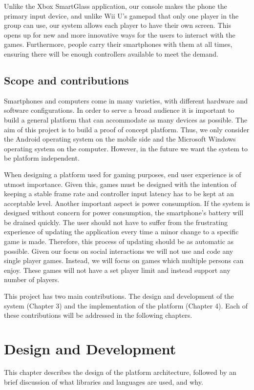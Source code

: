 \documentclass{article}
\begin{document}
Unlike the Xbox SmartGlass application, our console makes the phone the primary input device,
and unlike Wii U’s gamepad that only one player in the group can use, our system allows each
player to have their own screen. This opens up for new and more innovative ways for the users to
interact with the games. Furthermore, people carry their smartphones with them at all times,
ensuring there will be enough controllers available to meet the demand.


\subsection{Scope and contributions} 
Smartphones and computers come in many varieties, with different hardware and software
configurations. In order to serve a broad audience it is important to build a general platform that
can accommodate as many devices as possible. The aim of this project is to build a proof of
concept platform. Thus, we only consider the Android operating system on the mobile side and
the Microsoft Windows operating system on the computer. However, in the future we want the
system to be platform independent.

When designing a platform used for gaming purposes, end user experience is of utmost
importance. Given this, games must be designed with the intention of keeping a stable frame rate
and controller input latency has to be kept at an acceptable level. Another important aspect is
power consumption. If the system is designed without concern for power consumption, the
smartphone's battery will be drained quickly.
The user should not have to suffer from the frustrating experience of updating the application
every time a minor change to a specific game is made. Therefore, this process of updating should
be as automatic as possible.
Given our focus on social interactions we will not use and code any single player games. Instead, we will focus on games which multiple persons can enjoy. These games will not have a set player limit and instead support any number of players.

This project has two main contributions. The design and development of the system (Chapter
3) and the implementation of the platform (Chapter 4). Each of these contributions will be addressed in the following chapters.



\section{Design and Development} 
This chapter describes the design of the platform architecture, followed by an brief discussion
of what libraries and languages are used, and why.
\end{document}
